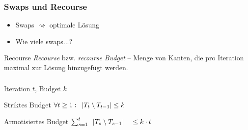 \begin{frame}
    \frametitle{Swaps und Recourse}
    \begin{itemize}
        \itemsep\setlength{1em}
        \item Swaps $\rightsquigarrow$ optimale Lösung
        \item Wie viele swaps...?
    \end{itemize}
    \vspace{1em}
    \begin{block}{Recourse}
        \vspace{1em}
        \emph{Recourse} bzw. \emph{recourse Budget} -- Menge von Kanten, die pro Iteration maximal zur Lösung hinzugefügt werden.
        \vspace{1em}
    \end{block}
\end{frame}

\begin{frame}
    \frametitle{\insertsubsection}
    \underline{Iteration $t$, Budget $k$}\\
    \vspace{1em}
    \begin{block}{Striktes Budget}
        \vspace{1em}
        $\forall t \geq 1:\hspace{0.5em}|T_t \setminus T_{t-1}| \leq k$
        \vspace{1em}
    \end{block}
    \vspace{1em}
    \begin{block}{Armotisiertes Budget}
        \vspace{1em}
        $ \sum_{s=1}^{t}\hspace{0.5em}|T_s \setminus T_{s-1}| \quad \leq k \cdot t$
        \vspace{1em}
    \end{block}
\end{frame}
